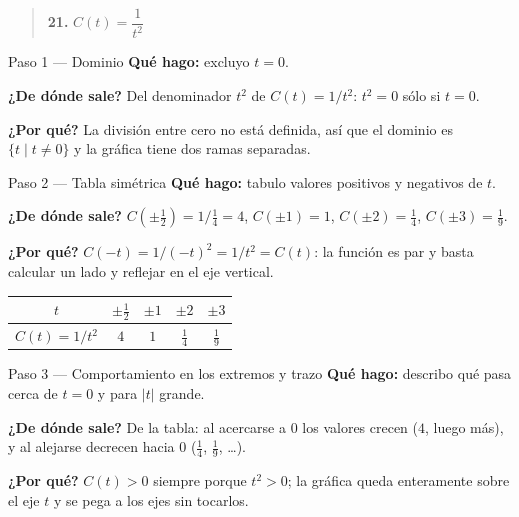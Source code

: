 \documentclass[11pt]{article}
\begin{document}
\begin{quote}
\textbf{21.} $C(t)=\dfrac{1}{t^2}$
\end{quote}

\begin{paso}{Paso 1 --- Dominio}
\textbf{Qué hago:} excluyo $t=0$.

\textbf{¿De dónde sale?} Del denominador $t^2$ de $C(t)=1/t^2$: $t^2=0$ sólo si $t=0$.

\textbf{¿Por qué?} La división entre cero no está definida, así que el dominio es $\{t \mid t\ne 0\}$ y la gráfica tiene dos ramas separadas.
\end{paso}

\begin{paso}{Paso 2 --- Tabla simétrica}
\textbf{Qué hago:} tabulo valores positivos y negativos de $t$.

\textbf{¿De dónde sale?} $C(\pm\tfrac12)=1/\tfrac14=4$, $C(\pm1)=1$, $C(\pm2)=\tfrac14$, $C(\pm3)=\tfrac19$.

\textbf{¿Por qué?} $C(-t)=1/(-t)^2=1/t^2=C(t)$: la función es par y basta calcular un lado y reflejar en el eje vertical.

\begin{center}
\begin{tabular}{|c|c|c|c|c|}
\hline
$t$ & $\pm\tfrac12$ & $\pm 1$ & $\pm 2$ & $\pm 3$\\\hline
$C(t)=1/t^2$ & $4$ & $1$ & $\tfrac14$ & $\tfrac19$\\\hline
\end{tabular}
\end{center}
\end{paso}

\begin{paso}{Paso 3 --- Comportamiento en los extremos y trazo}
\textbf{Qué hago:} describo qué pasa cerca de $t=0$ y para $|t|$ grande.

\textbf{¿De dónde sale?} De la tabla: al acercarse a $0$ los valores crecen ($4$, luego más), y al alejarse decrecen hacia $0$ ($\tfrac14$, $\tfrac19$, \dots).

\textbf{¿Por qué?} $C(t)>0$ siempre porque $t^2>0$; la gráfica queda enteramente sobre el eje $t$ y se pega a los ejes sin tocarlos.

\begin{center}
\end{center}
\end{paso}
\end{document}
